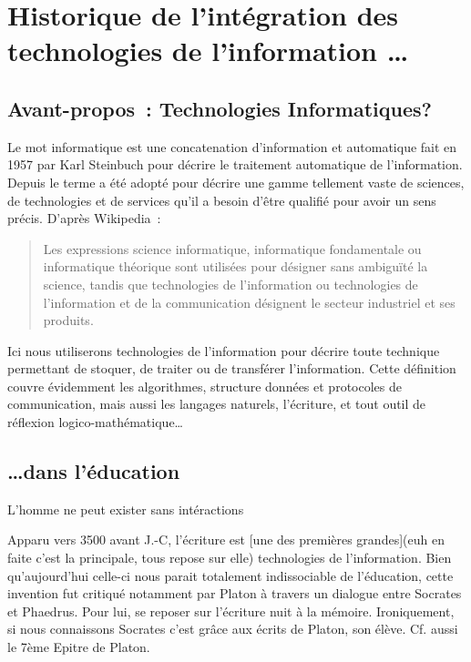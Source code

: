 
\chapter{Historique de l'intégration des technologies de l'information \ldots}\label{quoi}

\section{Avant-propos~: Technologies \og{}Informatiques\fg{}?}

Le mot \og{}informatique\fg{} est une concatenation d'\og{}information\fg{} et \og{}automatique\fg{} fait en 1957 par Karl Steinbuch\cite{steinbuch-2005} pour décrire le traitement automatique de l'information. 
Depuis le terme a été adopté pour décrire une gamme tellement vaste de sciences, de technologies et de services qu'il a besoin d'être qualifié pour avoir un sens précis. D'après Wikipedia\cite{wiki-informatique}~:
\begin{quote}
Les expressions \og{}science informatique\fg{}, \og{}informatique fondamentale\fg{} ou \og{}informatique théorique\fg{} sont utilisées pour désigner sans ambiguïté la science, tandis que \og{}technologies de l'information\fg{} ou \og{}technologies de l'information et de la communication\fg{} désignent le secteur industriel et ses produits.
\end{quote}
Ici nous utiliserons \og{}technologies de l'information\fg{} pour décrire toute technique permettant de stoquer, de traiter ou de transférer l'information. Cette définition couvre évidemment les algorithmes, structure données et protocoles de communication, mais aussi les langages naturels, l'écriture, et tout outil de réflexion logico-mathématique\ldots

\section{\ldots dans l'éducation}

L'homme ne peut exister sans intéractions 

Apparu vers 3500 avant J.-C\cite{dreyer00}, l'écriture est [une des premières grandes](euh en
faite c'est la principale, tous repose sur elle) \glspl{technologie} de
l'information. Bien qu'aujourd'hui celle-ci nous parait totalement
indissociable de l'éducation, cette invention fut critiqué notamment par Platon
à travers un dialogue entre Socrates et Phaedrus. Pour lui, se reposer sur
l'écriture nuit à la mémoire. Ironiquement, si nous connaissons Socrates c'est
grâce aux écrits de Platon, son élève. Cf. aussi le 7ème Epitre de Platon.


